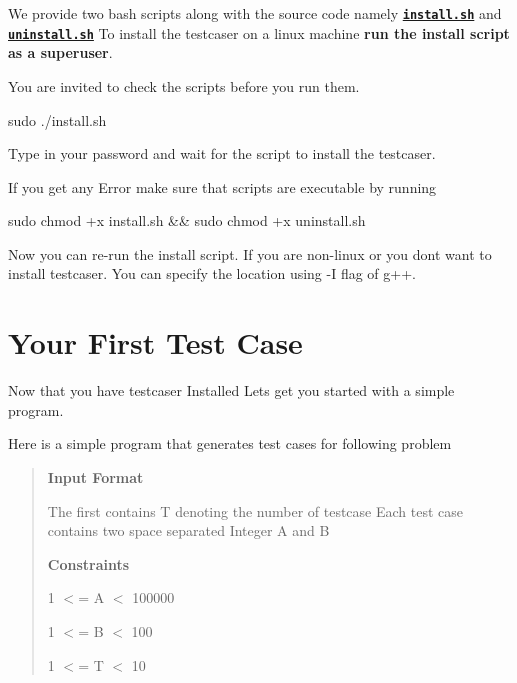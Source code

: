 We provide two bash scripts along with the source code namely \href{https://github.com/coder3101/testcaser/blob/master/install.sh}{\tt {\bfseries install.\+sh}} and \href{https://github.com/coder3101/testcaser/blob/master/uninstall.sh}{\tt {\bfseries uninstall.\+sh}} To install the testcaser on a linux machine {\bfseries run the install script as a superuser}.

You are invited to check the scripts before you run them.


\begin{DoxyCode}
sudo ./install.sh
\end{DoxyCode}


Type in your password and wait for the script to install the testcaser.

If you get any Error make sure that scripts are executable by running 
\begin{DoxyCode}
sudo chmod +x install.sh && sudo chmod +x uninstall.sh
\end{DoxyCode}


Now you can re-\/run the install script. If you are non-\/linux or you don\textquotesingle{}t want to install testcaser. You can specify the location using {\ttfamily -\/I} flag of {\ttfamily g++}. 

\hypertarget{index_started}{}\section{Your First Test Case}\label{index_started}
Now that you have testcaser Installed Let\textquotesingle{}s get you started with a simple program.

Here is a simple program that generates test cases for following problem \begin{quote}
{\bfseries Input Format}

The first contains T denoting the number of testcase Each test case contains two space separated Integer A and B

{\bfseries Constraints}

1 $<$= A $<$ 100000

1 $<$= B $<$ 100

1 $<$= T $<$ 10 \end{quote}



